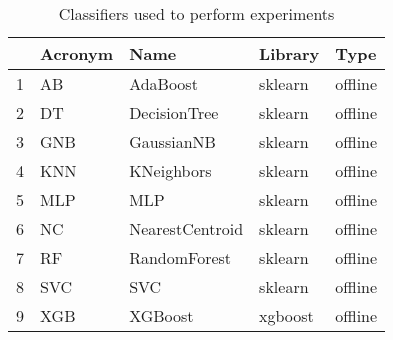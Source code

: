 \begin{table}
\footnotesize
\caption{Classifiers used to perform experiments}
\label{tab:algorithm}
\begin{tabular}{lllll}
\hline
 & Acronym & Name & Library & Type \\
\hline
1 & AB & AdaBoost & sklearn & offline \\
2 & DT & DecisionTree & sklearn & offline \\
3 & GNB & GaussianNB & sklearn & offline \\
4 & KNN & KNeighbors & sklearn & offline \\
5 & MLP & MLP & sklearn & offline \\
6 & NC & NearestCentroid & sklearn & offline \\
7 & RF & RandomForest & sklearn & offline \\
8 & SVC & SVC & sklearn & offline \\
9 & XGB & XGBoost & xgboost & offline \\
\hline
\end{tabular}
\end{table}
